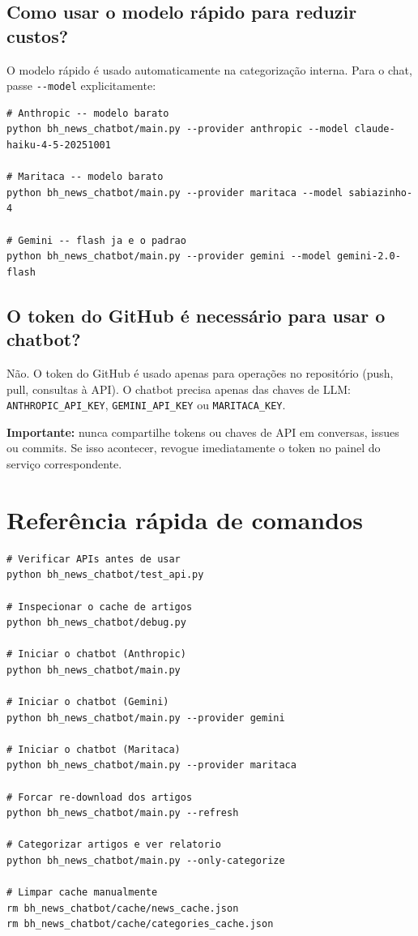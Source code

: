 \documentclass[12pt,a4paper]{article}
\newenvironment{nota}{%
  \begin{mdframed}[backgroundcolor=notecolor,linecolor=noteframe,linewidth=1.5pt,
    leftmargin=0pt,rightmargin=0pt,innerleftmargin=10pt,innerrightmargin=10pt,
    innertopmargin=8pt,innerbottommargin=8pt]
  \small
}{%
  \end{mdframed}
}
\begin{document}
\subsection{Como usar o modelo rápido para reduzir custos?}

O modelo rápido é usado automaticamente na categorização interna. Para o chat, passe
\texttt{-{}-model} explicitamente:

\begin{lstlisting}
# Anthropic -- modelo barato
python bh_news_chatbot/main.py --provider anthropic --model claude-haiku-4-5-20251001

# Maritaca -- modelo barato
python bh_news_chatbot/main.py --provider maritaca --model sabiazinho-4

# Gemini -- flash ja e o padrao
python bh_news_chatbot/main.py --provider gemini --model gemini-2.0-flash
\end{lstlisting}

\subsection{O token do GitHub é necessário para usar o chatbot?}

Não. O token do GitHub é usado apenas para operações no repositório (push, pull, consultas
à API). O chatbot precisa apenas das chaves de LLM: \texttt{ANTHROPIC\_API\_KEY},
\texttt{GEMINI\_API\_KEY} ou \texttt{MARITACA\_KEY}.

\begin{nota}
\textbf{Importante:} nunca compartilhe tokens ou chaves de API em conversas, issues ou
commits. Se isso acontecer, revogue imediatamente o token no painel do serviço correspondente.
\end{nota}

\section{Referência rápida de comandos}

\begin{lstlisting}
# Verificar APIs antes de usar
python bh_news_chatbot/test_api.py

# Inspecionar o cache de artigos
python bh_news_chatbot/debug.py

# Iniciar o chatbot (Anthropic)
python bh_news_chatbot/main.py

# Iniciar o chatbot (Gemini)
python bh_news_chatbot/main.py --provider gemini

# Iniciar o chatbot (Maritaca)
python bh_news_chatbot/main.py --provider maritaca

# Forcar re-download dos artigos
python bh_news_chatbot/main.py --refresh

# Categorizar artigos e ver relatorio
python bh_news_chatbot/main.py --only-categorize

# Limpar cache manualmente
rm bh_news_chatbot/cache/news_cache.json
rm bh_news_chatbot/cache/categories_cache.json
\end{lstlisting}
\end{document}
